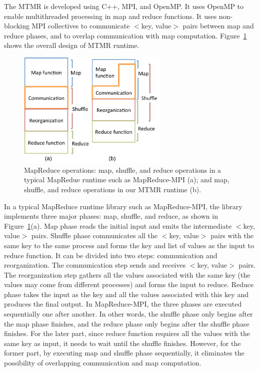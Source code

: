 \documentclass[10pt,conference,compsocconf]{IEEEtran}
\begin{document}
The MTMR is developed using C++, MPI, and OpenMP. It uses OpenMP to
enable multithreaded processing in map and reduce functions. It uses 
non-blocking MPI collectives to communicate $<$key, value$>$ pairs 
between map and reduce phases, and to overlap communication
with map computation. Figure~\ref{fig:overview_mtmr} shows the overall
design of MTMR runtime. 
\begin{figure}[!htb]
\centering
  \includegraphics[width=0.9\linewidth,height=2.2in]{figs/overview_mtmr.pdf}
  \caption{MapReduce operations: map, shuffle, and reduce operations in a
  typical MapRedue runtime such as MapReduce-MPI (a); and map, shuffle, and
  reduce operations in our MTMR runtime (b).}
  \label{fig:overview_mtmr}
\end{figure}

In a typical MapReduce runtime library such as MapReduce-MPI, the library
implements three major phases: map, shuffle, and reduce, as shown in 
Figure~\ref{fig:overview_mtmr}(a). Map phase reads the initial input and
emits the intermediate $<$key, value$>$ pairs. Shuffle phase communicates
all the $<$key, value$>$ pairs with the same key to the same process
and forms the key and list of values as the input to reduce function. It
can be divided into two steps: communication and reorganization. The 
communication step sends and receives $<$key, value$>$  pairs. 
The reorganization step gathers all the values associated with
the same key (the values may come from different processes) and 
forms the input to reduce. Reduce
phase takes the input as the key and all the values associated 
with this key and produces the final output. In MapReduce-MPI, the
three phases are executed sequentially one after another. In other
words, the shuffle phase only begins after the map phase finishes,
and the reduce phase only begins after the shuffle phase finishes.
For the later part, since reduce function requires all the values with 
the same key as input, it needs to wait until the shuffle finishes.
However, for the former part, by executing map and shuffle phase
sequentially, it eliminates the possibility of overlapping communication
and map computation.
\end{document}
